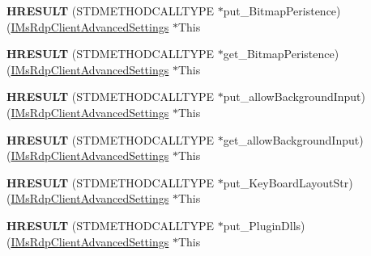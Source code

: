 \begin{DoxyCompactItemize}
{\bfseries H\+R\+E\+S\+U\+LT} (S\+T\+D\+M\+E\+T\+H\+O\+D\+C\+A\+L\+L\+T\+Y\+PE $\ast$put\+\_\+\+Bitmap\+Peristence)(\hyperlink{interface_m_s_t_s_c_lib_1_1_i_ms_rdp_client_advanced_settings}{I\+Ms\+Rdp\+Client\+Advanced\+Settings} $\ast$This
\item 
\mbox{\label{struct_m_s_t_s_c_lib_1_1_i_ms_rdp_client_advanced_settings_vtbl_a0739c9e4d1298f97e6b7a770865ded68}} 
{\bfseries H\+R\+E\+S\+U\+LT} (S\+T\+D\+M\+E\+T\+H\+O\+D\+C\+A\+L\+L\+T\+Y\+PE $\ast$get\+\_\+\+Bitmap\+Peristence)(\hyperlink{interface_m_s_t_s_c_lib_1_1_i_ms_rdp_client_advanced_settings}{I\+Ms\+Rdp\+Client\+Advanced\+Settings} $\ast$This
\item 
\mbox{\label{struct_m_s_t_s_c_lib_1_1_i_ms_rdp_client_advanced_settings_vtbl_a27aee39fab45eb3329fcd5f7001eb82a}} 
{\bfseries H\+R\+E\+S\+U\+LT} (S\+T\+D\+M\+E\+T\+H\+O\+D\+C\+A\+L\+L\+T\+Y\+PE $\ast$put\+\_\+allow\+Background\+Input)(\hyperlink{interface_m_s_t_s_c_lib_1_1_i_ms_rdp_client_advanced_settings}{I\+Ms\+Rdp\+Client\+Advanced\+Settings} $\ast$This
\item 
\mbox{\label{struct_m_s_t_s_c_lib_1_1_i_ms_rdp_client_advanced_settings_vtbl_ad8c40595921d6ca5afb7140b251bf190}} 
{\bfseries H\+R\+E\+S\+U\+LT} (S\+T\+D\+M\+E\+T\+H\+O\+D\+C\+A\+L\+L\+T\+Y\+PE $\ast$get\+\_\+allow\+Background\+Input)(\hyperlink{interface_m_s_t_s_c_lib_1_1_i_ms_rdp_client_advanced_settings}{I\+Ms\+Rdp\+Client\+Advanced\+Settings} $\ast$This
\item 
\mbox{\label{struct_m_s_t_s_c_lib_1_1_i_ms_rdp_client_advanced_settings_vtbl_ae0078639ec17cdb18f2d939ab1470ca7}} 
{\bfseries H\+R\+E\+S\+U\+LT} (S\+T\+D\+M\+E\+T\+H\+O\+D\+C\+A\+L\+L\+T\+Y\+PE $\ast$put\+\_\+\+Key\+Board\+Layout\+Str)(\hyperlink{interface_m_s_t_s_c_lib_1_1_i_ms_rdp_client_advanced_settings}{I\+Ms\+Rdp\+Client\+Advanced\+Settings} $\ast$This
\item 
\mbox{\label{struct_m_s_t_s_c_lib_1_1_i_ms_rdp_client_advanced_settings_vtbl_a1c3d2565f064b24b3f6872714325c0e9}} 
{\bfseries H\+R\+E\+S\+U\+LT} (S\+T\+D\+M\+E\+T\+H\+O\+D\+C\+A\+L\+L\+T\+Y\+PE $\ast$put\+\_\+\+Plugin\+Dlls)(\hyperlink{interface_m_s_t_s_c_lib_1_1_i_ms_rdp_client_advanced_settings}{I\+Ms\+Rdp\+Client\+Advanced\+Settings} $\ast$This

\end{DoxyCompactItemize}
